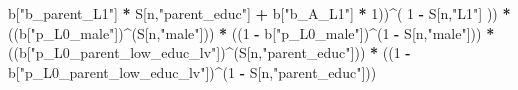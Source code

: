 \documentclass[
]{book}
\newenvironment{Shaded}{\begin{snugshade}}{\end{snugshade}}
\newcommand{\DecValTok}[1]{\textcolor[rgb]{0.00,0.00,0.81}{#1}}
\newcommand{\NormalTok}[1]{#1}
\newcommand{\SpecialCharTok}[1]{\textcolor[rgb]{0.81,0.36,0.00}{\textbf{#1}}}
\newcommand{\StringTok}[1]{\textcolor[rgb]{0.31,0.60,0.02}{#1}}
\begin{document}
\begin{Shaded}
\begin{Highlighting}[]
\NormalTok{                 b[}\StringTok{"b\_parent\_L1"}\NormalTok{] }\SpecialCharTok{*}\NormalTok{ S[n,}\StringTok{"parent\_educ"}\NormalTok{] }\SpecialCharTok{+}
\NormalTok{                 b[}\StringTok{"b\_A\_L1"}\NormalTok{] }\SpecialCharTok{*} \DecValTok{1}\NormalTok{))}\SpecialCharTok{\^{}}\NormalTok{( }\DecValTok{1} \SpecialCharTok{{-}}\NormalTok{ S[n,}\StringTok{"L1"}\NormalTok{] )) }\SpecialCharTok{*}
\NormalTok{      ((b[}\StringTok{"p\_L0\_male"}\NormalTok{])}\SpecialCharTok{\^{}}\NormalTok{(S[n,}\StringTok{"male"}\NormalTok{])) }\SpecialCharTok{*} 
\NormalTok{      ((}\DecValTok{1} \SpecialCharTok{{-}}\NormalTok{ b[}\StringTok{"p\_L0\_male"}\NormalTok{])}\SpecialCharTok{\^{}}\NormalTok{(}\DecValTok{1} \SpecialCharTok{{-}}\NormalTok{ S[n,}\StringTok{"male"}\NormalTok{])) }\SpecialCharTok{*} 
\NormalTok{      ((b[}\StringTok{"p\_L0\_parent\_low\_educ\_lv"}\NormalTok{])}\SpecialCharTok{\^{}}\NormalTok{(S[n,}\StringTok{"parent\_educ"}\NormalTok{])) }\SpecialCharTok{*}
\NormalTok{      ((}\DecValTok{1} \SpecialCharTok{{-}}\NormalTok{ b[}\StringTok{"p\_L0\_parent\_low\_educ\_lv"}\NormalTok{])}\SpecialCharTok{\^{}}\NormalTok{(}\DecValTok{1} \SpecialCharTok{{-}}\NormalTok{ S[n,}\StringTok{"parent\_educ"}\NormalTok{])) }
    

\end{Highlighting}
\end{Shaded}
\end{document}
